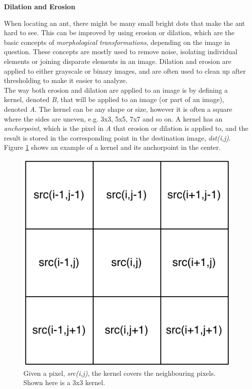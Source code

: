 \newpage

\noindent \textbf{Dilation and Erosion} \par

When locating an ant, there might be many small bright dots that make the ant hard to see. This can be improved by using erosion or dilation, which are the basic concepts of \textit{morphological transformations}\cite{theory1}, depending on the image in question. These concepts are mostly used to remove noise, isolating individual elements or joining disparate elements in an image\cite{theory1}. Dilation and erosion are applied to either grayscale or binary images, and are often used to clean up after thresholding to make it easier to analyze.\\

The way both erosion and dilation are applied to an image is by defining a kernel, denoted \textit{B}, that will be applied to an image (or part of an image), denoted \textit{A}. The kernel can be any shape or size, however it is often a square where the sides are uneven, e.g. 3x3, 5x5, 7x7 and so on\cite{theory1}. A kernel has an \textit{anchorpoint}, which is the pixel in \emph{A} that erosion or dilation is applied to, and the result is stored in the corresponding point in the destination image, \textit{dst(i,j)}. Figure \ref{fig:kernel_ed} shows an example of a kernel and its anchorpoint in the center. \\

\begin{figure}[ht!]
  \centering
    \includegraphics[scale=0.50]{img/Kernel_ED.pdf}
  \caption{Given a pixel, \emph{src(i,j)}, the kernel covers the neighbouring pixels. Shown here is a 3x3 kernel.}
  \label{fig:kernel_ed}
\end{figure}

